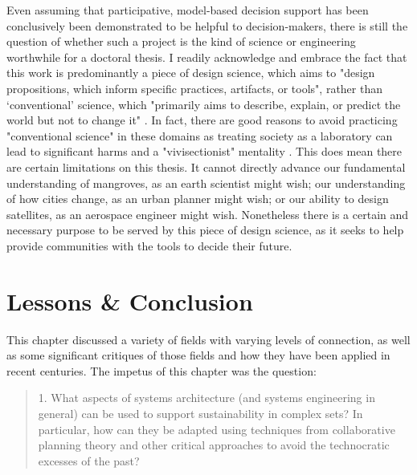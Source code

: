 Even assuming that participative, model-based decision support has been conclusively been demonstrated to be helpful to decision-makers, there is still the question of whether such a project is the kind of science or engineering worthwhile for a doctoral thesis. I readily acknowledge and embrace the fact that this work is predominantly a piece of design science, which aims to "design propositions, which inform specific practices, artifacts, or tools", rather than `conventional' science, which "primarily aims to describe, explain, or predict the world but not to change it" \cite{goodspeedScenarioPlanningCities2020}. In fact, there are good reasons to avoid practicing "conventional science" in these domains as treating society as a laboratory can lead to significant harms and a "vivisectionist" mentality \cite{banandynuriModernMedicineIts1990}. This does mean there are certain limitations on this thesis. It cannot directly advance our fundamental understanding of mangroves, as an earth scientist might wish; our understanding of how cities change, as an urban planner might wish; or our ability to design satellites, as an aerospace engineer might wish. Nonetheless there is a certain and necessary purpose to be served by this piece of design science, as it seeks to help provide communities with the tools to decide their future.







\section{Lessons \& Conclusion} \label{sec:chap2-conc}

This chapter discussed a variety of fields with varying levels of connection, as well as some significant critiques of those fields and how they have been applied in recent centuries. The impetus of this chapter was the question:

\blockquote{ 1. What aspects of systems architecture (and systems engineering in general) can be used to support sustainability in complex \ac{sets}? In particular, how can they be adapted using techniques from collaborative planning theory and other critical approaches to avoid the technocratic excesses of the past?}

